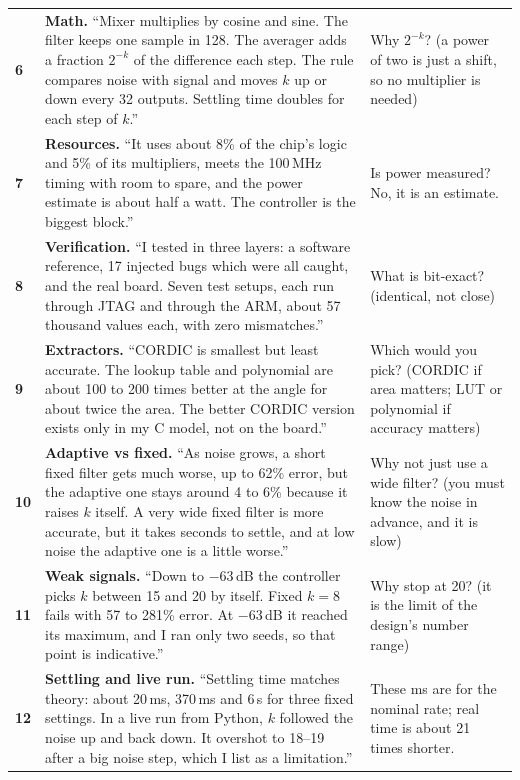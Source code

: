 \documentclass[11pt,a4paper]{article}
\begin{document}
\begin{longtable}{@{}p{0.8cm}p{9.6cm}p{5.2cm}@{}}
\textbf{6} & \textbf{Math.} ``Mixer multiplies by cosine and sine. The filter keeps one sample in 128. The averager adds a fraction $2^{-k}$ of the difference each step. The rule compares noise with signal and moves $k$ up or down every 32 outputs. Settling time doubles for each step of $k$.'' & Why $2^{-k}$? (a power of two is just a shift, so no multiplier is needed)\\
\textbf{7} & \textbf{Resources.} ``It uses about 8\% of the chip's logic and 5\% of its multipliers, meets the 100\,MHz timing with room to spare, and the power estimate is about half a watt. The controller is the biggest block.'' & Is power measured? No, it is an estimate.\\
\textbf{8} & \textbf{Verification.} ``I tested in three layers: a software reference, 17 injected bugs which were all caught, and the real board. Seven test setups, each run through JTAG and through the ARM, about 57 thousand values each, with zero mismatches.'' & What is bit-exact? (identical, not close)\\
\textbf{9} & \textbf{Extractors.} ``CORDIC is smallest but least accurate. The lookup table and polynomial are about 100 to 200 times better at the angle for about twice the area. The better CORDIC version exists only in my C model, not on the board.'' & Which would you pick? (CORDIC if area matters; LUT or polynomial if accuracy matters)\\
\textbf{10} & \textbf{Adaptive vs fixed.} ``As noise grows, a short fixed filter gets much worse, up to 62\% error, but the adaptive one stays around 4 to 6\% because it raises $k$ itself. A very wide fixed filter is more accurate, but it takes seconds to settle, and at low noise the adaptive one is a little worse.'' & Why not just use a wide filter? (you must know the noise in advance, and it is slow)\\
\textbf{11} & \textbf{Weak signals.} ``Down to $-63$\,dB the controller picks $k$ between 15 and 20 by itself. Fixed $k=8$ fails with 57 to 281\% error. At $-63$\,dB it reached its maximum, and I ran only two seeds, so that point is indicative.'' & Why stop at 20? (it is the limit of the design's number range)\\
\textbf{12} & \textbf{Settling and live run.} ``Settling time matches theory: about 20\,ms, 370\,ms and 6\,s for three fixed settings. In a live run from Python, $k$ followed the noise up and back down. It overshot to 18--19 after a big noise step, which I list as a limitation.'' & These ms are for the nominal rate; real time is about 21 times shorter.\\

\end{longtable}
\end{document}
